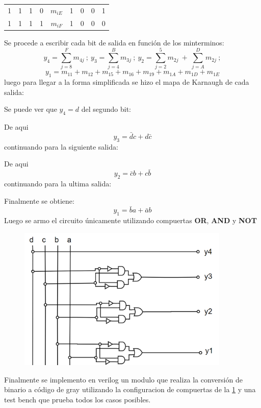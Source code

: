 \documentclass[a4paper]{article}
\begin{document}
\begin{table}[H]
\begin{tabular}{|c|c|c|c|c|c|c|c|c|}
1                                  & 1                                 & 1                                 & 0            & \textbf{$m_{iE}$} & 1                                   & 0                                   & 0                                   & 1                                   \\ \cline{5-5}
1                                  & 1                                 & 1                                 & 1            & \textbf{$m_{iF}$} & 1                                   & 0                                   & 0                                   & 0                                   \\ \cline{5-5}
\hline
\end{tabular}
\end{table}

Se procede a escribir cada bit de salida en función de los minterminos:
\[
	y_4 = \sum_{j=8}^{F} m_{4j}  \  ; \ y_3 = \sum_{j=4}^{B} m_{3j}\  ; \ y_2 = \sum_{j=2}^{5} m_{2j} \ + \  \sum_{j=A}^{D} m_{2j}  \  ;\]
\[
	y_1=m_{11}+m_{12}+m_{15}+m_{16}+m_{19}+m_{1A}+m_{1D}+m_{1E} 
\]
luego para llegar a la forma simplificada se hizo el mapa de Karnaugh de cada salida:



Se puede ver que $y_4 = d$ del segundo bit:



De aqui $$y_3 = \bar{d}c+d\bar{c}$$
continuando para la siguiente salida:



De aqui $$y_2 = \bar{c}b+c\bar{b}$$
continuando para la ultima salida:



Finalmente se obtiene: $$y_1 = \bar{b}a+\bar{a}b$$
Luego se armo el circuito únicamente utilizando compuertas \textbf{OR}, \textbf{AND} y \textbf{NOT}

\begin{figure}[H]
	\centering
	\includegraphics[width=0.9\textwidth]{Circuito3.png}
	\label{fig:circ3}
\end{figure}
Finalmente se implemento en verilog un modulo que realiza la conversión de binario a código de gray utilizando la configuracion de compuertas de la \ref{fig:circ3}
y una test bench que prueba todos los casos posibles.
\end{document}
